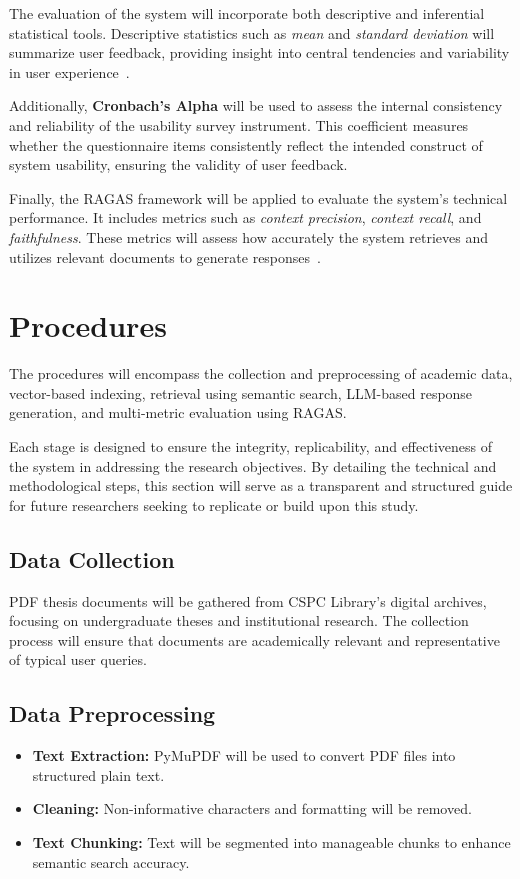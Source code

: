 \begin{refsection}
The evaluation of the system will incorporate both descriptive and inferential statistical tools. Descriptive statistics such as \textit{mean} and \textit{standard deviation} will summarize user feedback, providing insight into central tendencies and variability in user experience~\cite{holmes2023chatbot}.

Additionally, \textbf{Cronbach’s Alpha} will be used to assess the internal consistency and reliability of the usability survey instrument. This coefficient measures whether the questionnaire items consistently reflect the intended construct of system usability, ensuring the validity of user feedback.

Finally, the RAGAS framework will be applied to evaluate the system's technical performance. It includes metrics such as \textit{context precision}, \textit{context recall}, and \textit{faithfulness}. These metrics will assess how accurately the system retrieves and utilizes relevant documents to generate responses~\cite{holmes2023chatbot, ameli2024ranking, lin2024satisfaction}.

\section{Procedures}

The procedures will encompass the collection and preprocessing of academic data, vector-based indexing, retrieval using semantic search, LLM-based response generation, and multi-metric evaluation using RAGAS.

Each stage is designed to ensure the integrity, replicability, and effectiveness of the system in addressing the research objectives. By detailing the technical and methodological steps, this section will serve as a transparent and structured guide for future researchers seeking to replicate or build upon this study.

\subsection*{Data Collection}
PDF thesis documents will be gathered from CSPC Library’s digital archives, focusing on undergraduate theses and institutional research. The collection process will ensure that documents are academically relevant and representative of typical user queries.

\subsection*{Data Preprocessing}
\begin{itemize}
    \item \textbf{Text Extraction:} PyMuPDF will be used to convert PDF files into structured plain text.
    \item \textbf{Cleaning:} Non-informative characters and formatting will be removed.
    \item \textbf{Text Chunking:} Text will be segmented into manageable chunks to enhance semantic search accuracy.
\end{itemize}


\end{refsection}
